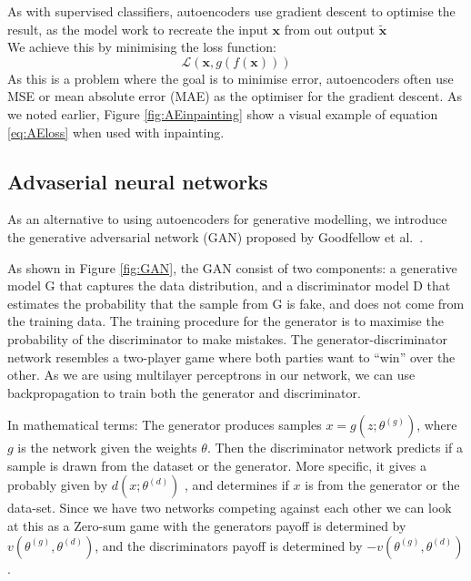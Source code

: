 As with supervised classifiers, autoencoders use gradient descent to optimise the result, as the model work to recreate the input $\textbf{x}$ from out output $\widetilde{\textbf{x}}$\\    
We achieve this by minimising the loss function:\\
\begin{equation}
    \mathcal{L}(\textbf{x},g(f(\textbf{x})))
    \label{eq:AEloss}
\end{equation}
As this is a problem where the goal is to minimise error, autoencoders often use MSE or mean absolute error (MAE) as the optimiser for the gradient descent. 
As we noted earlier, Figure \ref{fig:AEinpainting} show a visual example of equation \ref{eq:AEloss} when used with inpainting.


    
\subsection{Advaserial neural networks}
As an alternative to using autoencoders for generative modelling, we introduce the generative adversarial network (GAN) proposed by Goodfellow et al.~\cite{Goodfellow:2014:GAN:2969033.2969125}.

As shown in Figure \ref{fig:GAN}, the GAN consist of two components: a generative model G that captures the data distribution, and a discriminator model D that estimates the probability that the sample from G is fake, and does not come from the training data. The training procedure for the generator is to maximise the probability of the discriminator to make mistakes.
The generator-discriminator network resembles a two-player game where both parties want to ``win'' over the other.
As we are using multilayer perceptrons in our network, we can use backpropagation to train both the generator and discriminator. 

In mathematical terms:
The generator produces samples $x=g(z;\theta^{(g)})$, where $g$ is the network given the weights $\theta$. Then the discriminator network predicts if a sample is drawn from the dataset or the generator.
More specific, it gives a probably given by $d(x;\theta^{(d)})$ , and determines if $x$ is from the generator or the data-set. 
Since we have two networks competing against each other we can look at this as a Zero-sum game with the generators payoff is determined by $v(\theta^{(g)},\theta^{(d)})$, and the discriminators payoff is determined by $-v(\theta^{(g)},\theta^{(d)})$.

